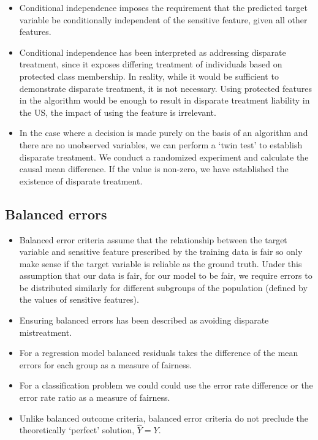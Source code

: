 \begin{itemize}[leftmargin=*]
\item Conditional independence imposes the requirement that the predicted target variable be conditionally independent of the sensitive feature, given all other features.
%
\item Conditional independence has been interpreted as addressing disparate treatment, since it exposes differing treatment of individuals based on protected class membership. In reality, while it would be sufficient to demonstrate disparate treatment, it is not necessary. Using protected features in the algorithm would be enough to result in disparate treatment liability in the US, the impact of using the feature is irrelevant.
%
\item In the case where a decision is made purely on the basis of an algorithm and there are no unobserved variables, we can perform a `twin test' to establish disparate treatment. We conduct a randomized experiment and calculate the causal mean difference. If the value is non-zero, we have established the existence of disparate treatment.
\end{itemize}

\subsection*{Balanced errors}

\begin{itemize}[leftmargin=*]
\item Balanced error criteria assume that the relationship between the target variable and sensitive feature prescribed by the training data is fair so only make sense if the target variable is reliable as the ground truth. Under this assumption that our data is fair, for our model to be fair, we require errors to be distributed similarly for different subgroups of the population (defined by the values of sensitive features).
%
\item Ensuring balanced errors has been described as avoiding disparate mistreatment.
%
\item For a regression model balanced residuals takes the difference of the mean errors for each group as a measure of fairness.
%
\item For a classification problem we could could use the error rate difference or the error rate ratio as a measure of fairness.
%
\item Unlike balanced outcome criteria, balanced error criteria do not preclude the theoretically ‘perfect' solution, $\hat{Y}=Y$.
\end{itemize}

